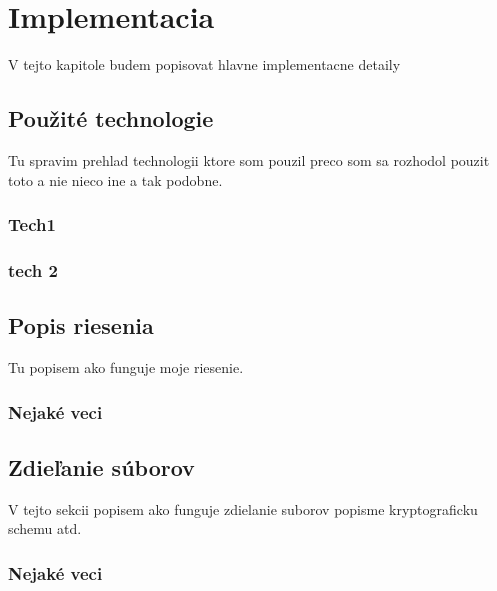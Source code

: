 \chapter{Implementacia}
	V tejto kapitole budem popisovat hlavne implementacne detaily

\section{Použité technologie}
	Tu spravim prehlad technologii ktore som pouzil preco som sa rozhodol pouzit toto a nie nieco ine a tak podobne.
	\subsection{Tech1}
	
	\subsection{tech 2}
	
\section{Popis riesenia}
	Tu popisem ako funguje moje riesenie.
	\subsection{Nejaké veci}

\section{Zdieľanie súborov}
	V tejto sekcii popisem ako funguje zdielanie suborov popisme kryptograficku schemu atd.
	\subsection{Nejaké veci}
